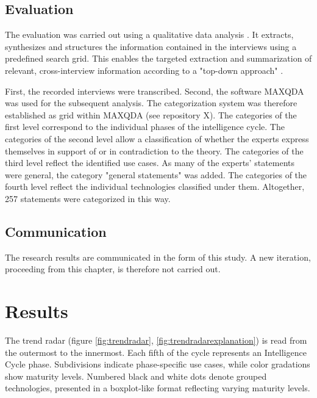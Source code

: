 \documentclass[10pt]{article}
\begin{document}
\subsection{Evaluation}

The evaluation was carried out using a qualitative data analysis \cite{Glaser.2009}.
It extracts, synthesizes and structures the information contained in the interviews
using a predefined search grid. This enables the targeted
extraction and summarization of relevant, cross-interview information
according to a "top-down approach" \cite{Bogner.2014, Glaser.2009}.

First, the recorded interviews were transcribed. Second, the software
MAXQDA was used for the subsequent analysis.
The categorization system was therefore established as grid within MAXQDA
(see repository X). The categories of the first level correspond to
the individual phases of the intelligence cycle. The categories of the
second level allow a classification of whether the experts express
themselves in support of or in contradiction to the theory. The
categories of the third level reflect the identified use cases.
As many of the experts' statements were general, the
category "general statements" was added. The categories
of the fourth level reflect the individual technologies classified
under them. Altogether, 257 statements were categorized in this way.

\subsection{Communication}

The research results are communicated in the form of this study.
A new iteration, proceeding from this chapter, is therefore not
carried out.

\section{Results} \label{sec:results}

The trend radar (figure \ref{fig:trendradar}, \ref{fig:trendradarexplanation}) is read from the outermost to the innermost.
Each fifth of the cycle represents an Intelligence Cycle phase. Subdivisions indicate
phase-specific use cases, while color gradations show maturity levels. Numbered black
and white dots denote grouped technologies, presented in a boxplot-like format reflecting
varying maturity levels.
\end{document}
